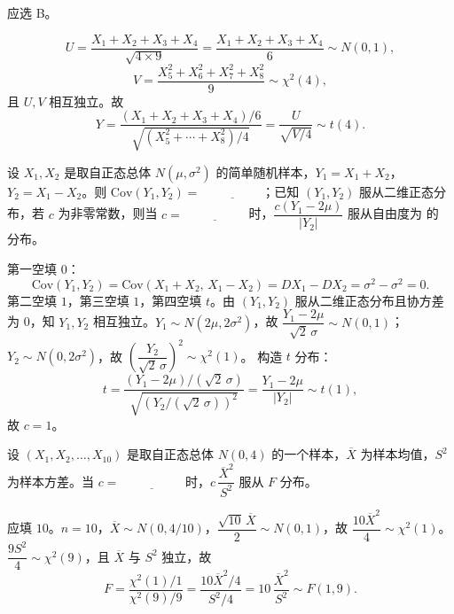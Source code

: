 \documentclass[lang=cn,11pt]{elegantbook}
\begin{document}
\begin{solution}
应选 B。

\[
U = \frac{X_1+X_2+X_3+X_4}{\sqrt{4 \times 9}} = \frac{X_1+X_2+X_3+X_4}{6} \sim N(0,1),
\]
\[
V = \frac{X_5^2+X_6^2+X_7^2+X_8^2}{9} \sim \chi^2(4),
\]
且 \(U, V\) 相互独立。故
\[
Y = \frac{(X_1+X_2+X_3+X_4)/6}{\sqrt{(X_5^2+\cdots+X_8^2)/4}} = \frac{U}{\sqrt{V/4}} \sim t(4).
\]
\end{solution}


\begin{exercise}\label{exer:6-cov-t}
设 \(X_1, X_2\) 是取自正态总体 \(N(\mu, \sigma^2)\) 的简单随机样本，\(Y_1=X_1+X_2\)，\(Y_2=X_1-X_2\)。则 \(\mathrm{Cov}(Y_1, Y_2) =\,\underline{\hspace{2cm}}\)；已知 \((Y_1, Y_2)\) 服从二维正态分布，若 \(c\) 为非零常数，则当 \(c =\,\underline{\hspace{2cm}}\) 时，\(\dfrac{c(Y_1-2\mu)}{|Y_2|}\) 服从自由度为\,\underline{\hspace{2cm}}\,的\,\underline{\hspace{2cm}}\,分布。
\end{exercise}
\begin{solution}
第一空填 \(0\)：
\[
\mathrm{Cov}(Y_1, Y_2) = \mathrm{Cov}(X_1+X_2,\, X_1-X_2) = DX_1 - DX_2 = \sigma^2 - \sigma^2 = 0.
\]
第二空填 \(1\)，第三空填 \(1\)，第四空填 \(t\)。由 \((Y_1,Y_2)\) 服从二维正态分布且协方差为 0，知 \(Y_1, Y_2\) 相互独立。\(Y_1 \sim N(2\mu, 2\sigma^2)\)，故 \(\dfrac{Y_1-2\mu}{\sqrt{2}\,\sigma} \sim N(0,1)\)；\(Y_2 \sim N(0, 2\sigma^2)\)，故 \(\left(\dfrac{Y_2}{\sqrt{2}\,\sigma}\right)^{\!2} \sim \chi^2(1)\)。
构造 \(t\) 分布：
\[
t = \frac{(Y_1-2\mu)/(\sqrt{2}\,\sigma)}{\sqrt{(Y_2/(\sqrt{2}\,\sigma))^2}} = \frac{Y_1-2\mu}{|Y_2|} \sim t(1),
\]
故 \(c = 1\)。
\end{solution}


\begin{exercise}\label{exer:6-f-xbar}
设 \((X_1, X_2, \dots, X_{10})\) 是取自正态总体 \(N(0, 4)\) 的一个样本，\(\overline{X}\) 为样本均值，\(S^2\) 为样本方差。当 \(c =\,\underline{\hspace{2cm}}\) 时，\(c\,\dfrac{\overline{X}^2}{S^2}\) 服从 \(F\) 分布。
\end{exercise}
\begin{solution}
应填 \(10\)。\(n=10\)，\(\overline{X} \sim N(0, 4/10)\)，\(\dfrac{\sqrt{10}\,\overline{X}}{2} \sim N(0,1)\)，故 \(\dfrac{10\overline{X}^2}{4} \sim \chi^2(1)\)。
\(\dfrac{9S^2}{4} \sim \chi^2(9)\)，且 \(\overline{X}\) 与 \(S^2\) 独立，故
\[
F = \frac{\chi^2(1)/1}{\chi^2(9)/9} = \frac{10\overline{X}^2/4}{S^2/4} = 10\,\frac{\overline{X}^2}{S^2} \sim F(1, 9).
\]
\end{solution}
\end{document}
